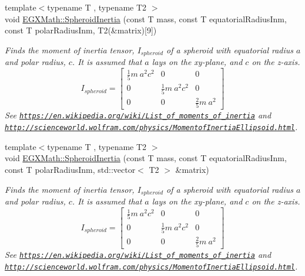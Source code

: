 \begin{DoxyCompactItemize}
\item 
{\footnotesize template$<$typename T , typename T2 $>$ }\\void \mbox{\hyperlink{group___e_g_x_math-_geometry-3_d-_spheroid-_inertia_ga4a6085f1b3504bd682ee6818542ae09e}{E\+G\+X\+Math\+::\+Spheroid\+Inertia}} (const T mass, const T equatorial\+Radius\+Inm, const T polar\+Radius\+Inm, T2(\&matrix)\mbox{[}9\mbox{]})
\begin{DoxyCompactList}\small\item\em Finds the moment of inertia tensor, $I_{spheroid}$ of a spheroid with equatorial radius $a$ and polar radius, $c$. It is assumed that $a$ lays on the xy-\/plane, and $c$ on the z-\/axis. \[ I_{spheroid}=\begin{bmatrix} \frac{1}{5}m\ a^2c^2 & 0 & 0\\ 0 & \frac{1}{5}m\ a^2c^2 & 0\\ 0 & 0 & \frac{2}{5}m\ a^2 \end{bmatrix} \] See \href{https://en.wikipedia.org/wiki/List_of_moments_of_inertia}{\tt https\+://en.\+wikipedia.\+org/wiki/\+List\+\_\+of\+\_\+moments\+\_\+of\+\_\+inertia} and \href{http://scienceworld.wolfram.com/physics/MomentofInertiaEllipsoid.html}{\tt http\+://scienceworld.\+wolfram.\+com/physics/\+Momentof\+Inertia\+Ellipsoid.\+html}. \end{DoxyCompactList}\item 
{\footnotesize template$<$typename T , typename T2 $>$ }\\void \mbox{\hyperlink{group___e_g_x_math-_geometry-3_d-_spheroid-_inertia_ga116b896696bbcc8d65d60ec5fc0210a0}{E\+G\+X\+Math\+::\+Spheroid\+Inertia}} (const T mass, const T equatorial\+Radius\+Inm, const T polar\+Radius\+Inm, std\+::vector$<$ T2 $>$ \&matrix)
\begin{DoxyCompactList}\small\item\em Finds the moment of inertia tensor, $I_{spheroid}$ of a spheroid with equatorial radius $a$ and polar radius, $c$. It is assumed that $a$ lays on the xy-\/plane, and $c$ on the z-\/axis. \[ I_{spheroid}=\begin{bmatrix} \frac{1}{5}m\ a^2c^2 & 0 & 0\\ 0 & \frac{1}{5}m\ a^2c^2 & 0\\ 0 & 0 & \frac{2}{5}m\ a^2 \end{bmatrix} \] See \href{https://en.wikipedia.org/wiki/List_of_moments_of_inertia}{\tt https\+://en.\+wikipedia.\+org/wiki/\+List\+\_\+of\+\_\+moments\+\_\+of\+\_\+inertia} and \href{http://scienceworld.wolfram.com/physics/MomentofInertiaEllipsoid.html}{\tt http\+://scienceworld.\+wolfram.\+com/physics/\+Momentof\+Inertia\+Ellipsoid.\+html}. \end{DoxyCompactList}\item 

\end{DoxyCompactItemize}
